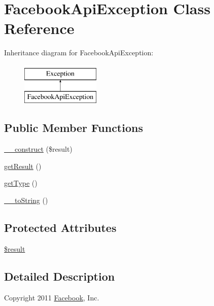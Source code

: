 \hypertarget{classFacebookApiException}{\section{Facebook\-Api\-Exception Class Reference}
\label{classFacebookApiException}
}
Inheritance diagram for Facebook\-Api\-Exception\-:\begin{figure}[H]
\begin{center}
\leavevmode
\includegraphics[height=2.000000cm]{classFacebookApiException}
\end{center}
\end{figure}
\subsection*{Public Member Functions}
\begin{DoxyCompactItemize}
\item 
\hyperlink{classFacebookApiException_a9e40d3c27096359975b952fe04752d19}{\-\_\-\-\_\-construct} (\$result)
\item 
\hyperlink{classFacebookApiException_ac6376ad18e5695a4ff443d4b6832f5f1}{get\-Result} ()
\item 
\hyperlink{classFacebookApiException_a6b119e3ab23ac69f3f51ee90aee6e688}{get\-Type} ()
\item 
\hyperlink{classFacebookApiException_a9c262b52fe807aad1c2770a0ad2ee919}{\-\_\-\-\_\-to\-String} ()
\end{DoxyCompactItemize}
\subsection*{Protected Attributes}
\begin{DoxyCompactItemize}
\item 
\hyperlink{classFacebookApiException_a7fb784ca5b949e79541f48d411cea829}{\$result}
\end{DoxyCompactItemize}


\subsection{Detailed Description}
Copyright 2011 \hyperlink{classFacebook}{Facebook}, Inc.

